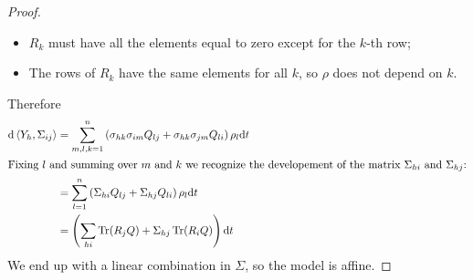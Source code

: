 \begin{proof}
    \begin{itemize}
        \item $R_k$ must have all the elements equal to zero except for the $k$-th row;
        \item The rows of $R_k$ have the same elements for all $k$, so $\rho$ does not depend on $k$.
    \end{itemize}
    Therefore
    \begin{align*}
        \dd\expval{Y_h, \Sigma_{ij}} &= \sum_{m,l,k=1}^n \left(\sigma_{hk}\sigma_{im}Q_{lj}+\sigma_{hk}\sigma_{jm}Q_{li}\right)\rho_l\dd t \\
        \intertext{Fixing $l$ and summing over $m$ and $k$ we recognize the developement of the matrix $\Sigma_{hi}$ and $\Sigma_{hj}$:}
        &=
        \sum_{l=1}^n \left(\Sigma_{hi}Q_{lj} + \Sigma_{hj}Q_{li}\right)\rho_l\dd t \\
        &=
        \left(\sum_{hi}\Tr(R_jQ) + \Sigma_{hj}\Tr(R_iQ)\right)\dd t
    \end{align*}
    We end up with a linear combination in $\Sigma$, so the model is affine.
\end{proof}

